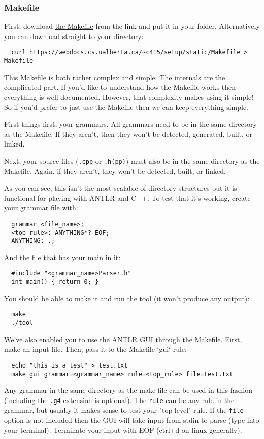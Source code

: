 \documentclass[../setup.tex]{subfiles}
\begin{document}
\subsubsection{Makefile}
First, download \href{https://webdocs.cs.ualberta.ca/\%7Ec415/setup/static/Makefile} {the
Makefile} from the link and put it in your folder. Alternatively you can download straight to your
directory:
\begin{lstlisting}
  curl https://webdocs.cs.ualberta.ca/~c415/setup/static/Makefile > Makefile
\end{lstlisting}
This Makefile is both rather complex and simple. The internals are the complicated part. If you'd
like to understand how the Makefile works then everything is well documented. However, that
complexity makes using it simple! So if you'd prefer to just use the Makefile then we can keep
everything simple.

First things first, your grammars. All grammars need to be in the same directory as the Makefile.
If they aren't, then they won't be detected, generated, built, or linked.

Next, your source files (\lstinline{.cpp} or \lstinline{.h(pp)}) must also be in the same directory
as the Makefile. Again, if they aren't, they won't be detected, built, or linked.

As you can see, this isn't the most scalable of directory structures but it is functional for
playing with ANTLR and C++. To test that it's working, create your grammar file with:
\begin{lstlisting}
  grammar <file_name>;
  <top_rule>: ANYTHING*? EOF;
  ANYTHING: .;
\end{lstlisting}
And the file that has your main in it:
\begin{lstlisting}
  #include "<grammar_name>Parser.h"
  int main() { return 0; }
\end{lstlisting}
You should be able to make it and run the tool (it won't produce any output):
\begin{lstlisting}
  make
  ./tool
\end{lstlisting}
We've also enabled you to use the ANTLR GUI through the Makefile. First, make an input file. Then,
pass it to the Makefile `gui` rule:
\begin{lstlisting}
  echo "this is a test" > test.txt
  make gui grammar=<grammar_name> rule=<top_rule> file=test.txt
\end{lstlisting}
Any grammar in the same directory as the make file can be used in this fashion (including the
\lstinline{.g4} extension is optional). The \lstinline{rule} can be any rule in the grammar, but
usually it makes sense to test your "top level" rule. If the \lstinline{file} option is not
included then the GUI will take input from stdin to parse (type into your terminal). Terminate
your input with EOF (ctrl+d on linux generally).
\end{document}
